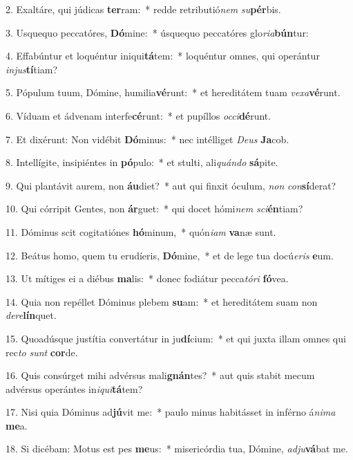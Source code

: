 2. Exaltáre, qui júdicas \textbf{ter}ram:~*  redde retributió\textit{nem} \textit{su}\textbf{pér}bis.\

3. Usquequo peccatóres, \textbf{Dó}mine:~*  úsquequo peccatóres glo\textit{ri}\textit{a}\textbf{bún}tur:\

4. Effabúntur et loquéntur iniqui\textbf{tá}tem:~*  loquéntur omnes, qui operántur \textit{in}\textit{jus}\textbf{tí}tiam?\

5. Pópulum tuum, Dómine, humilia\textbf{vé}runt:~*  et hereditátem tuam \textit{ve}\textit{xa}\textbf{vé}runt.\

6. Víduam et ádvenam interfe\textbf{cé}runt:~*  et pupíllos \textit{oc}\textit{ci}\textbf{dé}runt.\

7. Et dixérunt: Non vidébit \textbf{Dó}minus:~*  nec intélliget \textit{De}\textit{us} \textbf{Ja}cob.\

8. Intellígite, insipiéntes in \textbf{pó}pulo:~*  et stulti, ali\textit{quán}\textit{do} \textbf{sá}pite.\

9. Qui plantávit aurem, non \textbf{áu}diet?~*  aut qui finxit óculum, \textit{non} \textit{con}\textbf{sí}derat?\

10. Qui córripit Gentes, non \textbf{ár}guet:~*  qui docet hómi\textit{nem} \textit{sci}\textbf{én}tiam?\

11. Dóminus scit cogitatiónes \textbf{hó}minum,~*  quón\textit{i}\textit{am} \textbf{va}næ sunt.\

12. Beátus homo, quem tu erudíeris, \textbf{Dó}mine,~*  et de lege tua docú\textit{e}\textit{ris} \textbf{e}um.\

13. Ut mítiges ei a diébus \textbf{ma}lis:~*  donec fodiátur pecca\textit{tó}\textit{ri} \textbf{fó}vea.\

14. Quia non repéllet Dóminus plebem \textbf{su}am:~*  et hereditátem suam non \textit{de}\textit{re}\textbf{lín}quet.\

15. Quoadúsque justítia convertátur in ju\textbf{dí}cium:~*  et qui juxta illam omnes qui rec\textit{to} \textit{sunt} \textbf{cor}de.\

16. Quis consúrget mihi advérsus mali\textbf{gnán}tes?~*  aut quis stabit mecum advérsus operántes in\textit{i}\textit{qui}\textbf{tá}tem?\

17. Nisi quia Dóminus ad\textbf{jú}vit me:~*  paulo minus habitásset in inférno á\textit{ni}\textit{ma} \textbf{me}a.\

18. Si dicébam: Motus est pes \textbf{me}us:~*  misericórdia tua, Dómine, \textit{ad}\textit{ju}\textbf{vá}bat me.\

